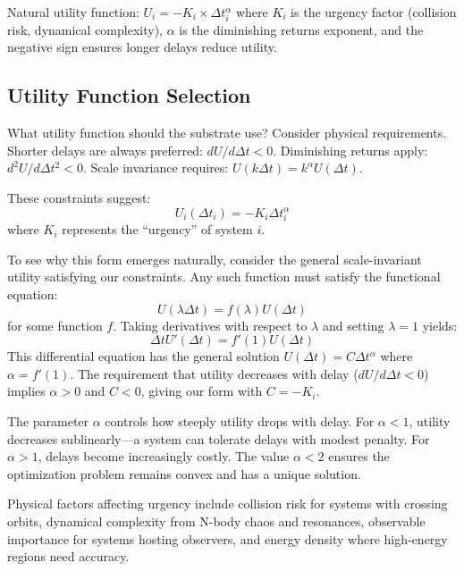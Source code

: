 \documentclass[twocolumn,prd,amsmath,amssymb,aps,superscriptaddress,nofootinbib]{revtex4-2}
\begin{document}
Natural utility function: $U_i = -K_i \times \Delta t_i^\alpha$ where $K_i$ is the urgency factor (collision risk, dynamical complexity), $\alpha$ is the diminishing returns exponent, and the negative sign ensures longer delays reduce utility.

\subsection{Utility Function Selection}

What utility function should the substrate use? Consider physical requirements. Shorter delays are always preferred: $dU/d\Delta t < 0$. Diminishing returns apply: $d^2U/d\Delta t^2 < 0$. Scale invariance requires: $U(k\Delta t) = k^\alpha U(\Delta t)$.

These constraints suggest:
\begin{equation}
U_i(\Delta t_i) = -K_i \Delta t_i^\alpha
\end{equation}
where $K_i$ represents the ``urgency'' of system $i$.

To see why this form emerges naturally, consider the general scale-invariant utility satisfying our constraints. Any such function must satisfy the functional equation:
\begin{equation}
U(\lambda \Delta t) = f(\lambda) U(\Delta t)
\end{equation}
for some function $f$. Taking derivatives with respect to $\lambda$ and setting $\lambda = 1$ yields:
\begin{equation}
\Delta t U'(\Delta t) = f'(1) U(\Delta t)
\end{equation}
This differential equation has the general solution $U(\Delta t) = C \Delta t^{\alpha}$ where $\alpha = f'(1)$. The requirement that utility decreases with delay ($dU/d\Delta t < 0$) implies $\alpha > 0$ and $C < 0$, giving our form with $C = -K_i$.

The parameter $\alpha$ controls how steeply utility drops with delay. For $\alpha < 1$, utility decreases sublinearly---a system can tolerate delays with modest penalty. For $\alpha > 1$, delays become increasingly costly. The value $\alpha < 2$ ensures the optimization problem remains convex and has a unique solution.

Physical factors affecting urgency include collision risk for systems with crossing orbits, dynamical complexity from N-body chaos and resonances, observable importance for systems hosting observers, and energy density where high-energy regions need accuracy.
\end{document}
